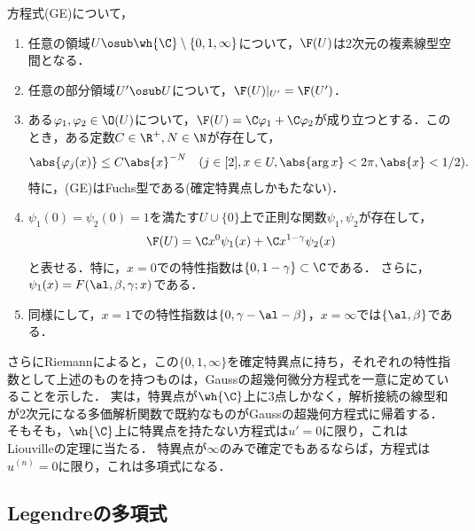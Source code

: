 \documentclass[uplatex,dvipdfmx]{jsreport}
\begin{document}
\begin{theorem}
    方程式(GE)について，
    \begin{enumerate}
        \item 任意の領域$U\osub\wh{\C}\setminus\{0,1,\infty\}$について，$\F(U)$は2次元の複素線型空間となる．
        \item 任意の部分領域$U'\osub U$について，$\F(U)|_{U'}=\F(U')$．
        \item ある$\varphi_1,\varphi_2\in\O(U)$について，$\F(U)=\C\varphi_1+\C\varphi_2$が成り立つとする．このとき，ある定数$C\in\R^+,N\in\N$が存在して，
        \[\abs{\varphi_j(x)}\le C\abs{x}^{-N}\quad(j\in[2],x\in U,\abs{\arg x}<2\pi,\abs{x}<1/2).\]
        特に，(GE)はFuchs型である(確定特異点しかもたない)．
        \item $\psi_1(0)=\psi_2(0)=1$を満たす$U\cup\{0\}$上で正則な関数$\psi_1,\psi_2$が存在して，
        \[\F(U)=\C x^0\psi_1(x)+\C x^{1-\gamma}\psi_2(x)\]
        と表せる．特に，$x=0$での特性指数は$\{0,1-\gamma\}\subset\C$である．
        さらに，$\psi_1(x)=F(\al,\beta,\gamma;x)$である．
        \item 同様にして，$x=1$での特性指数は$\{0,\gamma-\al-\beta\}$，$x=\infty$では$\{\al,\beta\}$である．
    \end{enumerate}
\end{theorem}
\begin{remarks}[方程式の特異点での局所的性質による統制]
    さらにRiemannによると，この$\{0,1,\infty\}$を確定特異点に持ち，それぞれの特性指数として上述のものを持つものは，Gaussの超幾何微分方程式を一意に定めていることを示した．
    実は，特異点が$\wh{\C}$上に3点しかなく，解析接続の線型和が2次元になる多価解析関数で既約なものがGaussの超幾何方程式に帰着する\cite{大島利雄-ODE}．
    そもそも，$\wh{\C}$上に特異点を持たない方程式は$u'=0$に限り，これはLiouvilleの定理に当たる．
    特異点が$\infty$のみで確定でもあるならば，方程式は$u^{(n)}=0$に限り，これは多項式になる．
\end{remarks}

\subsection{Legendreの多項式}
\end{document}
